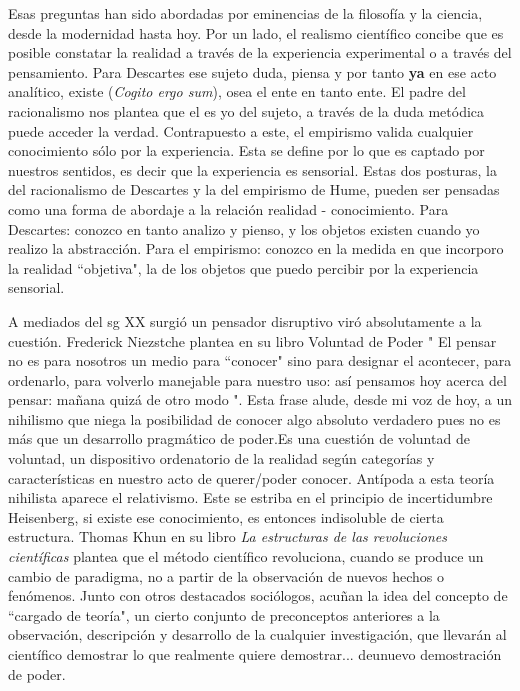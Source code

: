  Esas preguntas han sido abordadas por eminencias de la filosofía y la ciencia, desde la modernidad hasta hoy. Por un lado, el realismo científico concibe que es posible constatar la realidad a través de la experiencia experimental o a través del pensamiento. Para Descartes ese sujeto duda, piensa y por tanto \textbf{ya} en ese acto analítico, existe (\emph{Cogito ergo sum})\cite{descartes2004discurso}, osea el ente en tanto ente. El padre del racionalismo nos plantea que el es yo del sujeto, a través de la duda metódica puede acceder la verdad. Contrapuesto a este, el empirismo valida cualquier conocimiento sólo por la experiencia. Esta se define por lo que es captado por nuestros sentidos, es decir que la experiencia es sensorial. Estas dos posturas, la del racionalismo de Descartes y la del empirismo de Hume, pueden ser pensadas como una forma de abordaje a la relación realidad - conocimiento. Para Descartes: conozco en tanto analizo y pienso, y los objetos existen cuando yo realizo la abstracción. Para el empirismo: conozco en la medida en que incorporo la realidad ``objetiva", la de los objetos que puedo percibir por la experiencia sensorial. 

A mediados del sg XX surgió un pensador disruptivo viró absolutamente a la cuestión. Frederick Niezstche plantea en su libro Voluntad de Poder \cite{nietzsche2018voluntad}" El pensar no es para nosotros un medio para ``conocer" sino para designar el acontecer, para ordenarlo, para volverlo manejable para nuestro uso: así pensamos hoy acerca del pensar: mañana quizá de otro modo ". Esta frase alude, desde mi voz de hoy, a un nihilismo que niega la posibilidad de conocer algo absoluto verdadero pues no es más que un desarrollo pragmático de poder.Es una cuestión de voluntad de voluntad, un dispositivo ordenatorio de la realidad según categorías y características en nuestro acto de querer/poder conocer. Antípoda a esta teoría nihilista aparece el relativismo. Este se estriba en el principio de incertidumbre Heisenberg, si existe ese conocimiento, es entonces indisoluble de cierta estructura. Thomas Khun en su libro \emph{La estructuras de las revoluciones científicas} \cite{kuhn2019estructura} plantea que el método científico revoluciona, cuando se produce un cambio de paradigma, no a partir de la observación de nuevos hechos o fenómenos. Junto con otros destacados sociólogos, acuñan la idea del concepto de ``cargado de teoría", un cierto conjunto de preconceptos anteriores a la observación, descripción y desarrollo de la cualquier investigación, que llevarán al científico demostrar lo que realmente quiere demostrar... deunuevo demostración de poder.

